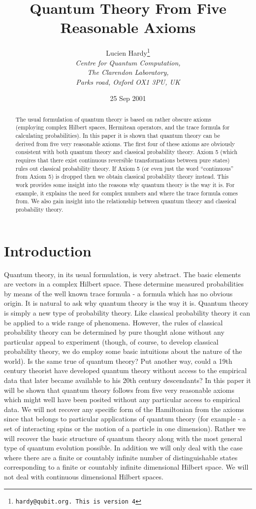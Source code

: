 \documentclass[12pt]{article}
\title{\textbf{Quantum Theory From Five Reasonable Axioms}}
\author{Lucien Hardy\thanks{\texttt{hardy@qubit.org.  This is version
4}}\\
\textit{Centre for Quantum Computation,}\\
\textit{The Clarendon Laboratory,}\\
\textit{Parks road, Oxford OX1 3PU, UK}}
\date{25 Sep 2001}
\begin{document}
\maketitle

\begin{abstract}
The usual formulation of quantum theory is based on rather obscure axioms
(employing complex Hilbert spaces, Hermitean operators, and the trace
formula for calculating probabilities).
In this paper it is shown that quantum theory can be derived from five
very reasonable axioms. The first four of these axioms are obviously
consistent with both quantum theory and classical probability theory.
Axiom 5 (which requires that there exist continuous reversible
transformations between pure states) rules out classical probability
theory.  If Axiom 5 (or even just the word ``continuous'' from Axiom 5)
is dropped then we obtain
classical probability theory instead.  This work provides some insight into
the reasons why quantum theory is the way it is.  For example, it explains
the need for complex numbers and where the trace formula comes from.
We also gain insight into the relationship between quantum theory and
classical probability theory.
\end{abstract}




\section{Introduction}

Quantum theory, in its usual formulation, is very abstract.  The basic
elements are vectors in a complex Hilbert space.  These determine
measured probabilities by means of the well known trace formula - a
formula which has no obvious origin.  It is natural to ask
why quantum theory is the way it is.  Quantum theory is simply a new
type of probability theory.  Like classical probability theory it can be
applied to a wide range of phenomena.  However, the rules of classical
probability theory can be determined by pure thought alone without any
particular appeal to experiment (though, of course, to develop
classical probability theory, we do employ some basic intuitions about
the nature of the world).  Is the same true of quantum theory?  Put
another way, could a 19th century theorist have developed quantum theory
without access to the empirical data that later became available to his
20th century descendants? In this paper it will be shown that quantum theory
follows from
five very reasonable axioms which might well have been posited without
any particular access to empirical data.  We will not recover any
specific form of
the Hamiltonian from the axioms since that belongs to particular
applications of quantum theory (for example - a set of interacting spins
or the motion of a particle in one dimension). Rather we will recover
the basic structure of quantum theory along with the most general type
of quantum evolution possible.  In addition we will only deal with the
case where there are a finite or countably infinite number of
distinguishable states corresponding to a finite or countably infinite
dimensional Hilbert space. We will not deal with continuous dimensional
Hilbert spaces.
\end{document}
